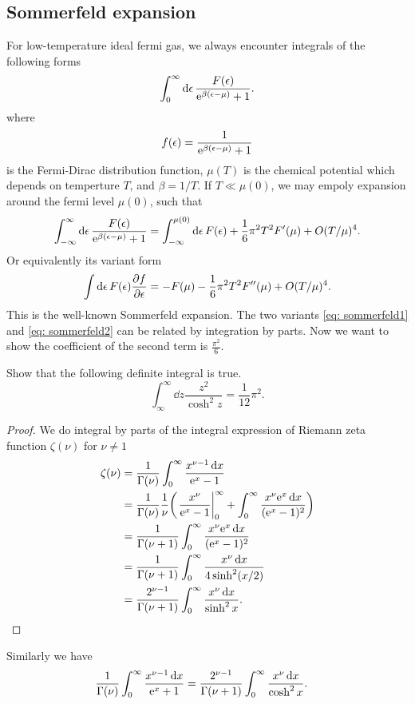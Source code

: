 \documentclass[10pt]{article}
\begin{document}
\subsection{Sommerfeld expansion}
For low-temperature ideal fermi gas, we always encounter integrals of the following forms 
\begin{equation}
	\int_0^{\infty} \dd{\epsilon} \frac{F(\epsilon)}{{\mathrm{e}}^{\beta(\epsilon - \mu)} + 1}.
\end{equation}
where 
\begin{equation}
	f(\epsilon) = \frac{1}{{\mathrm{e}}^{\beta(\epsilon - \mu)} + 1}
\end{equation}
is the Fermi-Dirac distribution function, $\mu(T)$ is the chemical potential which depends on temperture $T$, and $\beta = 1/T$. If $T \ll \mu(0)$, we may empoly expansion around the fermi level $\mu(0)$, such that 
\begin{equation}
	\int_{-\infty}^{\infty} \dd{\epsilon} \frac{F(\epsilon)}{{\mathrm{e}}^{\beta(\epsilon - \mu)} + 1} = \int_{-\infty}^{\mu(0)} \dd{\epsilon} F(\epsilon) + \frac{1}{6} \pi^2 T^2 F'(\mu) + O(T/\mu)^4. \label{eq: sommerfeld1}
\end{equation}
Or equivalently its variant form 
\begin{equation}
	\int \dd{\epsilon} F(\epsilon) \pdv{f}{\epsilon} = - F(\mu) - \frac{1}{6} \pi^2 T^2 F''(\mu) + O(T/\mu)^4. \label{eq: sommerfeld2}
\end{equation}
This is the well-known Sommerfeld expansion. The two variants \eqref{eq: sommerfeld1} and \eqref{eq: sommerfeld2} can be related by integration by parts. Now we want to show the coefficient of the second term is $\frac{\pi^2}{6}$. 
\begin{proposition}
	Show that the following definite integral is true.
	\begin{equation}
		\int_{\infty}^{\infty} \dd{z} \frac{z^2}{\cosh^2z} = \frac{1}{12}\pi^2.
	\end{equation}
\end{proposition}
\begin{proof}
	We do integral by parts of the integral expression of Riemann zeta function $\zeta(\nu)$ for $\nu \neq 1$
	\begin{align*}
		\zeta(\nu) &= \frac{1}{\Gamma(\nu)}\int_0^{\infty} \frac{x^{\nu - 1}\dd{x}}{\e^x - 1} \\
				   &= \frac{1}{\Gamma(\nu)}\frac{1}{\nu} \qty(\eval{\frac{x^{\nu}}{\e^x - 1}}_0^{\infty} + \int_0^{\infty} \frac{x^{\nu}\e^x \dd{x}}{(\e^x - 1)^2}) \\
				   &= \frac{1}{\Gamma(\nu + 1)} \int_0^{\infty} \frac{x^{\nu}\e^x \dd{x}}{(\e^x - 1)^2} \\
				   &= \frac{1}{\Gamma(\nu + 1)} \int_0^{\infty} \frac{x^{\nu} \dd{x}}{4\sinh^2(x/2)} \\
				   &= \frac{2^{\nu-1}}{\Gamma(\nu+1)} \int_0^{\infty} \frac{x^{\nu}\dd{x}}{\sinh^2 x}.
	\end{align*}
\end{proof}
Similarly we have 
\begin{align*}
	\frac{1}{\Gamma(\nu)}\int_0^{\infty} \frac{x^{\nu - 1}\dd{x}}{{\mathrm{e}}^x + 1} &= \frac{2^{\nu-1}}{\Gamma(\nu+1)} \int_0^{\infty} \frac{x^{\nu}\dd{x}}{\cosh^2 x}.
\end{align*}
\end{document}
